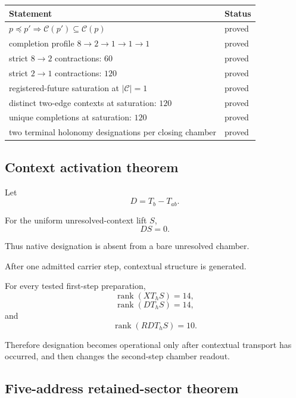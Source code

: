 \begin{center}
\begin{tabular}{p{} p{}}
\toprule
Statement & Status\\
\midrule

\(p\preceq p'
\Rightarrow
\mathcal C(p')\subseteq\mathcal C(p)\) &
proved\\

completion profile
\(8\to2\to1\to1\to1\) &
proved\\

strict \(8\to2\) contractions: \(60\) &
proved\\

strict \(2\to1\) contractions: \(120\) &
proved\\

registered-future saturation at
\(|\mathcal C|=1\) &
proved\\

distinct two-edge contexts at saturation: \(120\) &
proved\\

unique completions at saturation: \(120\) &
proved\\

two terminal holonomy designations per closing chamber &
proved\\

\bottomrule
\end{tabular}
\end{center}

\subsection{Context activation theorem}

Let
\[
D=T_b-T_{ab}.
\]

For the uniform unresolved-context lift \(S\),
\[
DS=0.
\]

Thus native designation is absent from a bare unresolved chamber.

After one admitted carrier step, contextual structure is generated.

For every tested first-step preparation,
\[
\operatorname{rank}(XT_hS)=14,
\]
\[
\operatorname{rank}(DT_hS)=14,
\]
and
\[
\operatorname{rank}(RDT_hS)=10.
\]

Therefore designation becomes operational only after contextual
transport has occurred, and then changes the second-step chamber
readout.

\subsection{Five-address retained-sector theorem}

